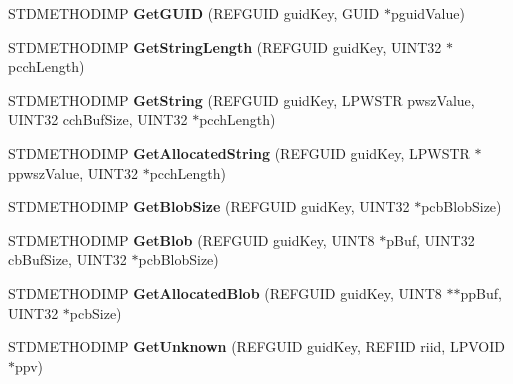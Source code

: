 \begin{DoxyCompactItemize}
\item 
\mbox{\label{class_c_base_attributes_a8fa72033d07979247dc3f69b84c5184f}} 
S\+T\+D\+M\+E\+T\+H\+O\+D\+I\+MP {\bfseries Get\+G\+U\+ID} (R\+E\+F\+G\+U\+ID guid\+Key, G\+U\+ID $\ast$pguid\+Value)
\item 
\mbox{\label{class_c_base_attributes_abd1c67438ede6952a7a994566f290a57}} 
S\+T\+D\+M\+E\+T\+H\+O\+D\+I\+MP {\bfseries Get\+String\+Length} (R\+E\+F\+G\+U\+ID guid\+Key, U\+I\+N\+T32 $\ast$pcch\+Length)
\item 
\mbox{\label{class_c_base_attributes_a5176024d090995cc9f278b498f336940}} 
S\+T\+D\+M\+E\+T\+H\+O\+D\+I\+MP {\bfseries Get\+String} (R\+E\+F\+G\+U\+ID guid\+Key, L\+P\+W\+S\+TR pwsz\+Value, U\+I\+N\+T32 cch\+Buf\+Size, U\+I\+N\+T32 $\ast$pcch\+Length)
\item 
\mbox{\label{class_c_base_attributes_ac95428515064c86912ac96e68c69837f}} 
S\+T\+D\+M\+E\+T\+H\+O\+D\+I\+MP {\bfseries Get\+Allocated\+String} (R\+E\+F\+G\+U\+ID guid\+Key, L\+P\+W\+S\+TR $\ast$ppwsz\+Value, U\+I\+N\+T32 $\ast$pcch\+Length)
\item 
\mbox{\label{class_c_base_attributes_a135df14fd94833ca8077213342a41056}} 
S\+T\+D\+M\+E\+T\+H\+O\+D\+I\+MP {\bfseries Get\+Blob\+Size} (R\+E\+F\+G\+U\+ID guid\+Key, U\+I\+N\+T32 $\ast$pcb\+Blob\+Size)
\item 
\mbox{\label{class_c_base_attributes_a4621edb40f520a60a5ca800860e66fc8}} 
S\+T\+D\+M\+E\+T\+H\+O\+D\+I\+MP {\bfseries Get\+Blob} (R\+E\+F\+G\+U\+ID guid\+Key, U\+I\+N\+T8 $\ast$p\+Buf, U\+I\+N\+T32 cb\+Buf\+Size, U\+I\+N\+T32 $\ast$pcb\+Blob\+Size)
\item 
\mbox{\label{class_c_base_attributes_a5895d62a0612286fde0d7190a2a2fce3}} 
S\+T\+D\+M\+E\+T\+H\+O\+D\+I\+MP {\bfseries Get\+Allocated\+Blob} (R\+E\+F\+G\+U\+ID guid\+Key, U\+I\+N\+T8 $\ast$$\ast$pp\+Buf, U\+I\+N\+T32 $\ast$pcb\+Size)
\item 
\mbox{\label{class_c_base_attributes_ab5d5c527b15fc5626631c7042f77319c}} 
S\+T\+D\+M\+E\+T\+H\+O\+D\+I\+MP {\bfseries Get\+Unknown} (R\+E\+F\+G\+U\+ID guid\+Key, R\+E\+F\+I\+ID riid, L\+P\+V\+O\+ID $\ast$ppv)
$$
\end{DoxyCompactItemize}
